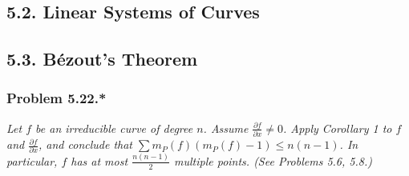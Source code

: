 \documentclass{article}
\begin{document}















\subsection*{5.2. Linear Systems of Curves \\}






\subsection*{5.3. B\'ezout's Theorem \\}




\subsubsection*{Problem 5.22.*}
\emph{Let $f$ be an irreducible curve of degree $n$.
Assume $\frac{\partial f}{\partial x} \neq 0$.
Apply Corollary 1 to $f$ and $\frac{\partial f}{\partial x}$,
and conclude that $\sum m_P(f)(m_P(f)-1) \leq n(n-1)$.
In particular, $f$ has at most $\frac{n(n-1)}{2}$ multiple points.
(See Problems 5.6, 5.8.)} \\
\end{document}

